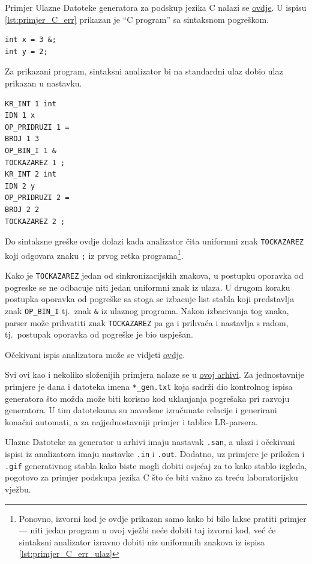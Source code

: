 \documentclass[times, 12pt, utf8]{book}
\begin{document}
Primjer Ulazne Datoteke generatora za podskup jezika C nalazi se \href{}{ovdje}.
U ispisu \ref{lst:primjer_C_err} prikazan je ``C program'' sa sintaksnom pogreškom.

\begin{lstlisting}[caption={Jednostavan C program sa sintaksnom greškom.},label=lst:primjer_C_err]
int x = 3 &;
int y = 2;

\end{lstlisting}

Za prikazani program, sintaksni analizator bi na standardni ulaz dobio ulaz prikazan u nastavku.

\begin{lstlisting}[caption={Ulaz za sintaksni analizator za program \ref{lst:primjer_C_err}.},label=lst:primjer_C_err_ulaz]
KR_INT 1 int
IDN 1 x
OP_PRIDRUZI 1 =
BROJ 1 3
OP_BIN_I 1 &
TOCKAZAREZ 1 ;
KR_INT 2 int
IDN 2 y
OP_PRIDRUZI 2 =
BROJ 2 2
TOCKAZAREZ 2 ;

\end{lstlisting}

Do sintaksne greške ovdje dolazi kada analizator čita uniformni znak \verb|TOCKAZAREZ| koji odgovara znaku \verb|;| iz prvog retka programa\footnote{Ponovno, izvorni kod je ovdje prikazan samo kako bi bilo lakse pratiti primjer --- niti jedan program u ovoj vježbi neće dobiti taj izvorni kod, već će sintaksni analizator izravno dobiti niz uniformnih znakova iz ispisa \ref{lst:primjer_C_err_ulaz}}.

Kako je \verb|TOCKAZAREZ| jedan od sinkronizacijskih znakova, u postupku oporavka od pogreske se ne odbacuje niti jedan uniformni znak iz ulaza.
U drugom koraku postupka oporavka od pogreške sa stoga se izbacuje list stabla koji predstavlja znak \verb|OP_BIN_I| tj.~znak \verb|&| iz ulaznog programa.
Nakon izbacivanja tog znaka, parser može prihvatiti znak \verb|TOCKAZAREZ| pa ga i prihvaća i nastavlja s radom, tj.~postupak oporavka od pogreške je bio uspješan.

Očekivani ispis analizatora može se vidjeti \href{}{ovdje}.

Svi ovi kao i nekoliko složenijih primjera nalaze se u \href{}{ovoj arhivi}.
Za jednostavnije primjere je dana i datoteka imena \verb|*_gen.txt| koja sadrži dio kontrolnog ispisa generatora što možda može biti korisno kod uklanjanja pogrešaka pri razvoju generatora.
U tim datotekama su navedene izračunate relacije i generirani konačni automati, a za najjednostavniji primjer i tablice LR-parsera.

Ulazne Datoteke za generator u arhivi imaju nastavak \verb|.san|, a ulazi i očekivani ispisi iz analizatora imaju nastavke \verb|.in| i \verb|.out|.
Dodatno, uz primjere je priložen i \verb|.gif| generativnog stabla kako biste mogli dobiti osjećaj za to kako stablo izgleda, pogotovo za primjer podskupa jezika C što će biti važno za treću laboratorijsku vježbu.
\end{document}
